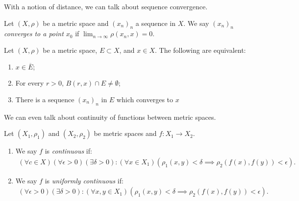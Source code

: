     With a notion of distance, we can talk about sequence convergence.

    \begin{definition}
        Let $(X,\rho)$ be a metric space and $(x_n)_n$ a sequence in $X$. We say $(x_n)_n$ \textit{converges to a point $x_0$} if $\lim_{n \rightarrow \infty}\rho(x_n,x) = 0$.
    \end{definition}

    \begin{proposition}
        Let $(X,\rho)$ be a metric space, $E \subset X$, and $x \in X$. The following are equivalent:
        \begin{enumerate}[label = (\arabic*),itemsep=1pt,topsep=3pt]
            \item $x \in \overline{E}$;
            \item For every $r > 0$, $B(r,x) \cap E \neq \emptyset$;
            \item There is a sequence $(x_n)_n$ in $E$ which converges to $x$
        \end{enumerate}
    \end{proposition}

    We can even talk about continuity of functions between metric spaces.

    \begin{definition}
        Let $(X_1,\rho_1)$ and $(X_2,\rho_2)$ be metric spaces and $f:X_1 \rightarrow X_2$. 
        \begin{enumerate}[label = (\arabic*),itemsep=1pt,topsep=3pt]
            \item We say $f$ is \textit{continuous} if:
                \begin{equation*}
                \begin{split}
                    (\forall c \in X)(\forall \epsilon > 0)(\exists \delta > 0):(\forall x \in X_1)(\rho_1(x,y) < \delta \implies \rho_2(f(x),f(y))<\epsilon).
                \end{split}
                \end{equation*}
            \item We say $f$ is \textit{uniformly continuous} if:
                \begin{equation*}
                \begin{split}
                    (\forall \epsilon > 0)(\exists \delta > 0):(\forall x,y \in X_1)(\rho_1(x,y) < \delta \implies \rho_2(f(x),f(y))<\epsilon).
                \end{split}
                \end{equation*}
        \end{enumerate}
    \end{definition}

